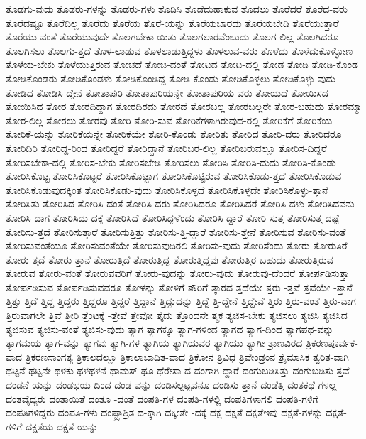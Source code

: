 {ತೊಡಗು-ವುದು
ತೊಡರು-ಗಳನ್ನು
ತೊಡರು-ಗಳು
ತೊಡಿಸಿ
ತೊಡೆದುಹಾಕುವ
ತೊದಲು
ತೊರೆದರೆ
ತೊರೆದ-ವರು
ತೊರೆದಷ್ಟೂ
ತೊರೆದಿಲ್ಲ
ತೊರೆದು
ತೊರೆಯ
ತೊರೆ-ಯನ್ನು
ತೊರೆಯಬಾರದು
ತೊರೆಯಬೇಡಿ
ತೊರೆಯುತ್ತಾರೆ
ತೊರೆಯು-ವಂತೆ
ತೊರೆಯುವುದೇ
ತೊಲಗಬೇಕಾ-ಯಿತು
ತೊಲಗಲಾರವೆಂಬುದು
ತೊಲಗ-ಲಿಲ್ಲ
ತೊಲಗಿದರೂ
ತೊಲಗಿಸಲು
ತೊಲಗು-ತ್ತದೆ
ತೊಳ-ಲಾಡುವ
ತೊಳಲಾಡುತ್ತಿದ್ದಳು
ತೊಳಲುವ-ವರು
ತೊಳೆದು
ತೊಳೆದುಕೊಳ್ಳೋಣ
ತೊಳೆಯ-ಬೇಕು
ತೊಳೆಯುತ್ತಿರುವ
ತೋಚದೆ
ತೋಚಿ-ದಂತೆ
ತೋಟದ
ತೋಟ-ದಲ್ಲಿ
ತೋಡ
ತೋಡಿ
ತೋಡಿ-ಕೊಂಡ
ತೋಡಿಕೊಂಡರು
ತೋಡಿಕೊಂಡಳು
ತೋಡಿಕೊಂಡಿದ್ದ
ತೋಡಿ-ಕೊಂಡು
ತೋಡಿಕೊಳ್ಳಲು
ತೋಡಿಕೊಳ್ಳು-ವುದು
ತೋಡಿದ
ತೋಡಿಸಿ-ದ್ದೇನೆ
ತೋತಾಪುರಿ
ತೋತಾಪುರಿಯನ್ನೇ
ತೋತಾಪುರಿಯ-ವರು
ತೋಯದೆ
ತೋಯಿಸದ
ತೋಯಿಸಿದ
ತೋರ
ತೋರದಿದ್ದಾಗ
ತೋರದಿರದು
ತೋರದೆ
ತೋರಬಲ್ಲ
ತೋರಬಲ್ಲರೇ
ತೋರ-ಬಹುದು
ತೋರಮ್ಮಾ
ತೋರ-ಲಿಲ್ಲ
ತೋರಲು
ತೋರವು
ತೋರಿ
ತೋರಿ-ಸುವ
ತೋರಿಕೆಗಳಾಗಿರುವುದ-ರಲ್ಲಿ
ತೋರಿಕೆಗೆ
ತೋರಿಕೆಯ
ತೋರಿಕೆ-ಯನ್ನು
ತೋರಿಕೆಯನ್ನೇ
ತೋರಿಕೆಯೇ
ತೋರಿ-ಕೊಂಡು
ತೋರಿತು
ತೋರಿದ
ತೋರಿ-ದರು
ತೋರಿದರೂ
ತೋರಿದಿರಿ
ತೋರಿದ್ದ-ರಿಂದ
ತೋರಿದ್ದರೆ
ತೋರಿದ್ದಾನೆ
ತೋರಿಬರ-ಲಿಲ್ಲ
ತೋರಿಬರುವಲ್ಲೂ
ತೋರಿಸ-ದಿದ್ದರೆ
ತೋರಿಸಬೇಕಾ-ದಲ್ಲಿ
ತೋರಿಸ-ಬೇಕು
ತೋರಿಸಬೇಡಿ
ತೋರಿಸಲು
ತೋರಿಸಿ
ತೋರಿಸಿ-ದುದು
ತೋರಿಸಿ-ಕೊಂಡು
ತೋರಿಸಿಕೊಟ್ಟ
ತೋರಿಸಿಕೊಟ್ಟರೆ
ತೋರಿಸಿಕೊಟ್ಟಾಗ
ತೋರಿಸಿಕೊಟ್ಟಿರುವ
ತೋರಿಸಿಕೊಡು-ತ್ತದೆ
ತೋರಿಸಿಕೊಡುವ
ತೋರಿಸಿಕೊಡುವುದಕ್ಕಿಂತ
ತೋರಿಸಿಕೊಡು-ವುದು
ತೋರಿಸಿಕೊಳ್ಳದೆ
ತೋರಿಸಿಕೊಳ್ಳದೇ
ತೋರಿಸಿಕೊಳ್ಳು-ತ್ತಾನೆ
ತೋರಿಸಿತು
ತೋರಿಸಿದ
ತೋರಿಸಿ-ದಂತೆ
ತೋರಿಸಿ-ದರು
ತೋರಿಸಿದರೂ
ತೋರಿಸಿದರೆ
ತೋರಿಸಿ-ದಳು
ತೋರಿಸಿದವನು
ತೋರಿಸಿ-ದಾಗ
ತೋರಿಸಿದು-ದಕ್ಕೆ
ತೋರಿಸಿದೆ
ತೋರಿಸಿದ್ದಳೆಂದು
ತೋರಿಸಿ-ದ್ದಾರೆ
ತೋರಿ-ಸುತ್ತ
ತೋರಿಸುತ್ತ-ದಷ್ಟೆ
ತೋರಿಸು-ತ್ತದೆ
ತೋರಿಸುತ್ತಾರೆ
ತೋರಿಸುತ್ತಿತ್ತು
ತೋರಿಸು-ತ್ತಿ-ದ್ದಾರೆ
ತೋರಿಸು-ತ್ತೇನೆ
ತೋರಿಸುವ
ತೋರಿಸು-ವಂತೆ
ತೋರಿಸುವಂತೆಯೂ
ತೋರಿಸುವಂತೆಯೇ
ತೋರಿಸುವುದಿರಲಿ
ತೋರಿಸು-ವುದು
ತೋರಿಸೆಂದು
ತೋರು
ತೋರುತಿರೆ
ತೋರು-ತ್ತದೆ
ತೋರು-ತ್ತಾನೆ
ತೋರುತ್ತಿದೆ
ತೋರುತ್ತಿದ್ದ
ತೋರುತ್ತಿದ್ದವು
ತೋರುತ್ತಿರ-ಬಹುದು
ತೋರುತ್ತಿರುವ
ತೋರುವ
ತೋರು-ವಂತೆ
ತೋರುವವರಿಗೆ
ತೋರು-ವುದನ್ನು
ತೋರು-ವುದು
ತೋರುವು-ದೆಂದರೆ
ತೋರ್ಪಡಿಸುತ್ತಾ
ತೋರ್ಪಡಿಸುವ
ತೋರ್ಪಡಿಸುವವರೂ
ತೋಳನ್ನು
ತೋಳಿಗೆ
ತೌರಿಗೆ
ತ್ಕಾರದ
ತ್ತದೆಯೇ
ತ್ತರು
-ತ್ತವೆ
ತ್ತವೆಯೇ
-ತ್ತಾನೆ
ತ್ತಿತ್ತು
ತ್ತಿದೆ
ತ್ತಿದ್ದ
ತ್ತಿದ್ದರು
ತ್ತಿದ್ದರೂ
ತ್ತಿದ್ದರೆ
ತ್ತಿದ್ದಾನೆ
ತ್ತಿದ್ದುದನ್ನು
ತ್ತಿದ್ದೆ
ತ್ತಿ-ದ್ದೇನೆ
ತ್ತಿದ್ದೇವೆ
ತ್ತಿರು
ತ್ತಿರು-ವಂತೆ
ತ್ತಿರು-ವಾಗ
ತ್ತಿರುವಾಗಲೇ
ತ್ತಿವೆ
ತ್ತೀರಿ
ತ್ತೆಂಟಕ್ಕೆ
-ತ್ತೇವೆ
ತ್ತೇವೋ
ತ್ತೈದು
ತ್ತೊಂದನೇ
ತ್ಮಕ
ತ್ಯಜಿಸ-ಬೇಕು
ತ್ಯಜಿಸಲು
ತ್ಯಜಿಸಿ
ತ್ಯಜಿಸಿದ
ತ್ಯಜಿಸುವ
ತ್ಯಜಿಸು-ವಂತೆ
ತ್ಯಜಿಸು-ವುದು
ತ್ಯಾಗ
ತ್ಯಾಗಕ್ಕೂ
ತ್ಯಾಗ-ಗಳಿಂದ
ತ್ಯಾಗದ
ತ್ಯಾಗ-ದಿಂದ
ತ್ಯಾಗಪಥ-ವನ್ನು
ತ್ಯಾಗಮಯ
ತ್ಯಾಗ-ವನ್ನು
ತ್ಯಾಗವು
ತ್ಯಾಗಿ-ಗಳ
ತ್ಯಾಗಿಯ
ತ್ಯಾಗಿಯವರ
ತ್ಯಾಗಿಯು
ತ್ಯಾಗೀ
ತ್ರಾಣವಿರದ
ತ್ರಿಕರಣಪೂರ್ವಕ-ವಾದ
ತ್ರಿಕರಣಸಾಂಗತ್ಯ
ತ್ರಿಕಾಲದಲ್ಲೂ
ತ್ರಿಕಾಲಾಬಾಧಿತ-ವಾದ
ತ್ರಿಕೋನ
ತ್ರಿವಿಧ
ತ್ರಿವೇಂಡ್ರಂನ
ತ್ರೈಮಾಸಿಕ
ತ್ವರಿತ-ವಾಗಿ
ಥಟ್ಟನೆ
ಥಟ್ಟನೇ
ಥಳಕು
ಥಳಥಳನೆ
ಥಾಮಸ್
ಥೂ
ಥೆರೇಸಾ
ದ
ದಂಗಾಗಿ-ದ್ದಾರೆ
ದಂಗುಬಡಿಸಿತ್ತು
ದಂಗುಬಡಿಸು-ತ್ತವೆ
ದಂಡನೆ-ಯನ್ನು
ದಂಡಭಯ-ದಿಂದ
ದಂಡ-ವನ್ನು
ದಂಡಿಸಲ್ಪಟ್ಟವನೂ
ದಂಡಿಸು-ತ್ತಾನೆ
ದಂಡೆತ್ತಿ
ದಂತಕಥೆ-ಗಳಲ್ಲ
ದಂತವೈದ್ಯರು
ದಂತಾಯಿತೆ
ದಂತೂ
-ದಂತೆ
ದಂಪತಿ-ಗಳ
ದಂಪತಿ-ಗಳಲ್ಲಿ
ದಂಪತಿಗಳಾಗಲಿ
ದಂಪತಿ-ಗಳಿಗೆ
ದಂಪತಿಗಳಿದ್ದರು
ದಂಪತಿ-ಗಳು
ದಂಷ್ಟ್ರಾಶ್ರಿತ
ದ-ಕ್ಕಾಗಿ
ದಕ್ಕೀತೇ
-ದಕ್ಕೆ
ದಕ್ಷ
ದಕ್ಷತೆ
ದಕ್ಷತೆಇವು
ದಕ್ಷತೆ-ಗಳನ್ನು
ದಕ್ಷತೆ-ಗಳಿಗೆ
ದಕ್ಷತೆಯ
ದಕ್ಷತೆ-ಯನ್ನು
}
